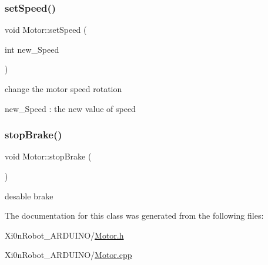 \subsubsection{\texorpdfstring{set\+Speed()}{setSpeed()}}
{\footnotesize\ttfamily void Motor\+::set\+Speed (\begin{DoxyParamCaption}\item[{int}]{new\+\_\+\+Speed }\end{DoxyParamCaption})}



change the motor speed rotation 

new\+\_\+\+Speed \+: the new value of speed \mbox{\label{class_motor_aeeb75807f8bda1d83456590e740b3c32}} 
\subsubsection{\texorpdfstring{stop\+Brake()}{stopBrake()}}
{\footnotesize\ttfamily void Motor\+::stop\+Brake (\begin{DoxyParamCaption}{ }\end{DoxyParamCaption})}



desable brake 



The documentation for this class was generated from the following files\+:\begin{DoxyCompactItemize}
\item 
Xi0n\+Robot\+\_\+\+A\+R\+D\+U\+I\+N\+O/\hyperlink{_motor_8h}{Motor.\+h}\item 
Xi0n\+Robot\+\_\+\+A\+R\+D\+U\+I\+N\+O/\hyperlink{_motor_8cpp}{Motor.\+cpp}\end{DoxyCompactItemize}
